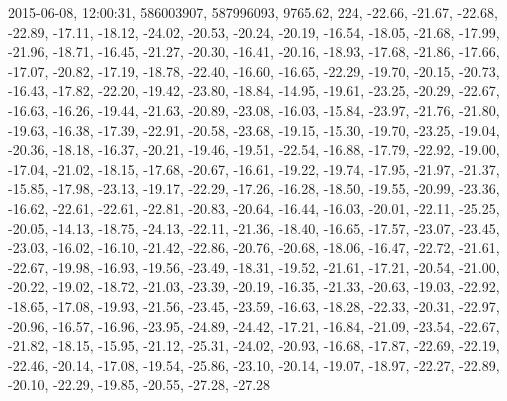 2015-06-08, 12:00:31, 586003907, 587996093, 9765.62, 224, -22.66, -21.67, -22.68, -22.89, -17.11, -18.12, -24.02, -20.53, -20.24, -20.19, -16.54, -18.05, -21.68, -17.99, -21.96, -18.71, -16.45, -21.27, -20.30, -16.41, -20.16, -18.93, -17.68, -21.86, -17.66, -17.07, -20.82, -17.19, -18.78, -22.40, -16.60, -16.65, -22.29, -19.70, -20.15, -20.73, -16.43, -17.82, -22.20, -19.42, -23.80, -18.84, -14.95, -19.61, -23.25, -20.29, -22.67, -16.63, -16.26, -19.44, -21.63, -20.89, -23.08, -16.03, -15.84, -23.97, -21.76, -21.80, -19.63, -16.38, -17.39, -22.91, -20.58, -23.68, -19.15, -15.30, -19.70, -23.25, -19.04, -20.36, -18.18, -16.37, -20.21, -19.46, -19.51, -22.54, -16.88, -17.79, -22.92, -19.00, -17.04, -21.02, -18.15, -17.68, -20.67, -16.61, -19.22, -19.74, -17.95, -21.97, -21.37, -15.85, -17.98, -23.13, -19.17, -22.29, -17.26, -16.28, -18.50, -19.55, -20.99, -23.36, -16.62, -22.61, -22.61, -22.81, -20.83, -20.64, -16.44, -16.03, -20.01, -22.11, -25.25, -20.05, -14.13, -18.75, -24.13, -22.11, -21.36, -18.40, -16.65, -17.57, -23.07, -23.45, -23.03, -16.02, -16.10, -21.42, -22.86, -20.76, -20.68, -18.06, -16.47, -22.72, -21.61, -22.67, -19.98, -16.93, -19.56, -23.49, -18.31, -19.52, -21.61, -17.21, -20.54, -21.00, -20.22, -19.02, -18.72, -21.03, -23.39, -20.19, -16.35, -21.33, -20.63, -19.03, -22.92, -18.65, -17.08, -19.93, -21.56, -23.45, -23.59, -16.63, -18.28, -22.33, -20.31, -22.97, -20.96, -16.57, -16.96, -23.95, -24.89, -24.42, -17.21, -16.84, -21.09, -23.54, -22.67, -21.82, -18.15, -15.95, -21.12, -25.31, -24.02, -20.93, -16.68, -17.87, -22.69, -22.19, -22.46, -20.14, -17.08, -19.54, -25.86, -23.10, -20.14, -19.07, -18.97, -22.27, -22.89, -20.10, -22.29, -19.85, -20.55, -27.28, -27.28
